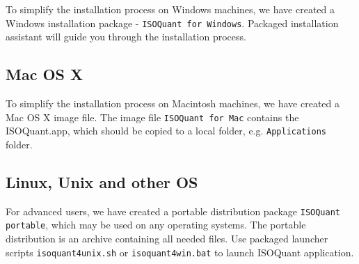 \documentclass[]{article}
\begin{document}
To simplify the installation process on Windows machines, we have
created a Windows installation package -
\lstinline!ISOQuant for Windows!. Packaged installation assistant will
guide you through the installation process.

\subsection{Mac OS X}

To simplify the installation process on Macintosh machines, we have
created a Mac OS X image file. The image file
\lstinline!ISOQuant for Mac! contains the ISOQuant.app, which should be
copied to a local folder, e.g. \lstinline!Applications! folder.

\subsection{Linux, Unix and other OS}

For advanced users, we have created a portable distribution package
\lstinline!ISOQuant portable!, which may be used on any operating
systems. The portable distribution is an archive containing all needed
files. Use packaged launcher scripts \lstinline!isoquant4unix.sh! or
\lstinline!isoquant4win.bat! to launch ISOQuant application.
\end{document}
